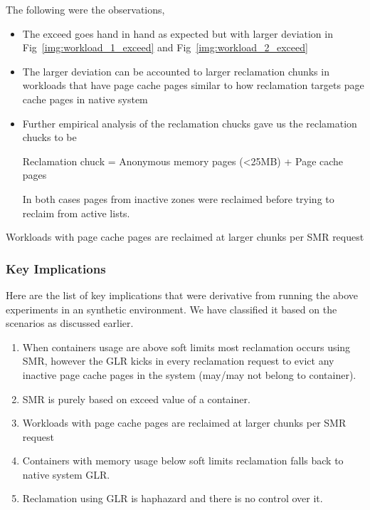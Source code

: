 	  The following were the observations,	  
	  \begin{itemize}
	    \item The exceed goes hand in hand as expected but with larger deviation in Fig~\ref{img:workload_1_exceed} and 
  Fig~\ref{img:workload_2_exceed}
	    \item The larger deviation can be accounted to larger reclamation chunks in workloads that have page cache pages similar to how 
  reclamation targets page cache pages in native system
	    \item Further empirical analysis of the reclamation chucks gave us the reclamation chucks to be 
		\begin{center}
		    Reclamation chuck = Anonymous memory pages (\textless 25MB) + Page cache pages
		\end{center}
		In both cases pages from inactive zones were reclaimed before trying to reclaim from active lists.
	  \end{itemize}

	    Workloads with page cache pages are reclaimed at larger chunks per SMR request
	  
      \subsubsection{Key Implications}
    
	Here are the list of key implications that were derivative from running the above experiments in an synthetic environment. We have 
    classified it based on the scenarios as discussed earlier.
	
	\begin{enumerate}
	  \item When containers usage are above soft limits most reclamation occurs using SMR, however the GLR kicks in every reclamation 
    request to evict any  inactive page cache pages in the system (may/may not belong to container).      
	  \item SMR is purely based on exceed value of a container.
	  \item Workloads with page cache pages are reclaimed at larger chunks per SMR request
	  \item Containers with memory usage below soft limits reclamation falls back to native system GLR.
	  \item Reclamation using GLR is haphazard and there is no control over it. 
	\end{enumerate}
	
